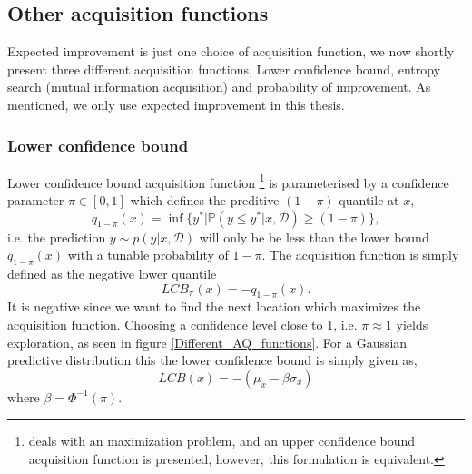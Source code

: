 \subsection{Other acquisition functions}
Expected improvement is just one choice of acquisition function, we now shortly present three different acquisition functions, 
Lower confidence bound, entropy search (mutual information acquisition) and probability of improvement. As mentioned, we
only use expected improvement in this thesis.

\subsubsection{Lower confidence bound}
Lower confidence bound acquisition function \cite[145]{bayesoptbook}\footnote{
\cite[145]{bayesoptbook} deals with an maximization problem, and an upper confidence bound
acquisition function is presented, however, this formulation is equivalent.} is parameterised by a
confidence parameter $\pi \in [0,1]$ which defines the preditive $(1-\pi)$-quantile at $x$,
 $$q_{1-\pi}(x) = \inf \{y^*|\mathbb{P}(y\leq y^* | x, \mathcal{D}) \geq (1-\pi) \},$$
i.e. the prediction $y \sim p(y|x, \mathcal{D})$ will only be be less than the lower bound $q_{1-\pi}(x) $
with a tunable probability of $1-\pi$. 
The acquisition function is simply defined as the negative lower quantile
$$LCB_{\pi}(x) = -q_{1-\pi}(x).$$ It is negative since we want to find the next location which
maximizes the acquisition function. Choosing a confidence level close to 1, i.e. $\pi \approx 1$ yields
exploration, as seen in figure \ref{Different_AQ_functions}. For a Gaussian predictive distribution
this the lower confidence bound is simply given as, 
$$LCB(x) = - (\mu_x - \beta \sigma_x)$$
where $\beta = \Phi^{-1}(\pi)$. 

